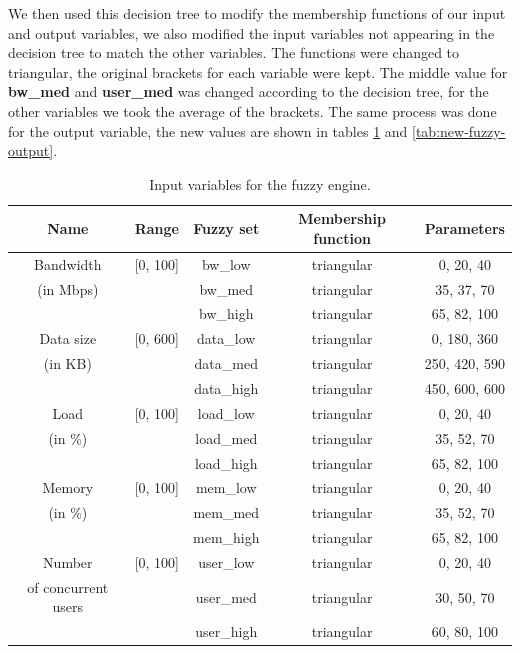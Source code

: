 We then used this decision tree to modify the membership functions of our input and output variables, we also modified
the input variables not appearing in the decision tree to match the other variables. The functions were changed to
triangular, the original brackets for each variable were kept. The middle value for \textbf{bw_med} and \textbf{user_med}
was changed according to the decision tree, for the other variables we took the average of the brackets. The same process
was done for the output variable, the new values are shown in tables \ref{tab:new-fuzzy-input} and
\ref{tab:new-fuzzy-output}.

\begin{table}[H]
	\centering
	\begin{tabular}{|c|c|c|c|c|}
		\hline
		Name                & Range    & Fuzzy set & Membership function & Parameters    \\
		\hline
		Bandwidth           & [0, 100] & bw_low    & triangular          & 0, 20, 40     \\
		(in Mbps)           &          & bw_med    & triangular          & 35, 37, 70    \\
		                    &          & bw_high   & triangular          & 65, 82, 100   \\
		\hline
		Data size           & [0, 600] & data_low  & triangular          & 0, 180, 360   \\
		(in KB)             &          & data_med  & triangular          & 250, 420, 590 \\
		                    &          & data_high & triangular          & 450, 600, 600 \\
		\hline
		Load                & [0, 100] & load_low  & triangular          & 0, 20, 40     \\
		(in \%)             &          & load_med  & triangular          & 35, 52, 70    \\
		                    &          & load_high & triangular          & 65, 82, 100   \\
		\hline
		Memory              & [0, 100] & mem_low   & triangular          & 0, 20, 40     \\
		(in \%)             &          & mem_med   & triangular          & 35, 52, 70    \\
		                    &          & mem_high  & triangular          & 65, 82, 100   \\
		\hline
		Number              & [0, 100] & user_low  & triangular          & 0, 20, 40     \\
		of concurrent users &          & user_med  & triangular          & 30, 50, 70    \\
		                    &          & user_high & triangular          & 60, 80, 100   \\
		\hline
	\end{tabular}
	\caption{Input variables for the fuzzy engine.}
	\label{tab:new-fuzzy-input}
\end{table}

